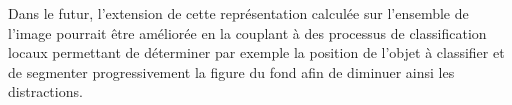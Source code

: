 %
%
%
%
%
Dans le futur, l'extension de cette représentation calculée sur l'ensemble de l'image pourrait être améliorée en la couplant à des processus de classification locaux permettant de déterminer par exemple la position de l'objet à classifier et de segmenter progressivement la figure du fond afin de diminuer ainsi les distractions.

